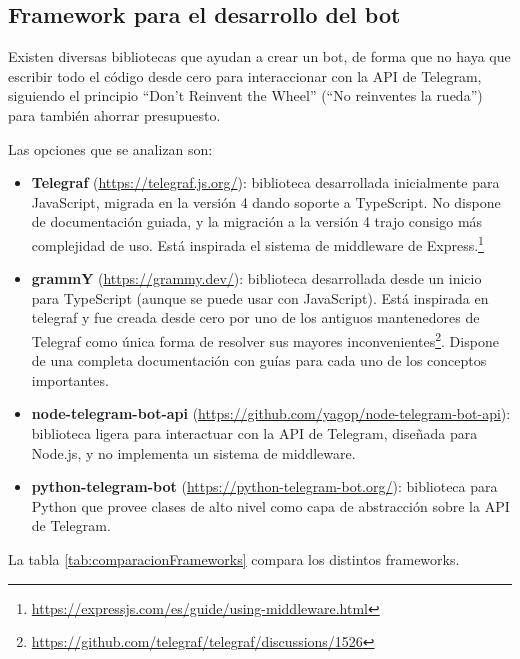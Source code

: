 \subsection{Framework para el desarrollo del bot}\label{subsection:elegirFramework}

Existen diversas bibliotecas que ayudan a crear un bot, de forma que no haya que escribir todo el código desde cero para interaccionar con la API de Telegram, siguiendo el principio ``Don't Reinvent the Wheel'' (``No reinventes la rueda'') para también ahorrar presupuesto.

Las opciones que se analizan son:

\begin{itemize}
    \item \textbf{Telegraf} (\url{https://telegraf.js.org/}): biblioteca desarrollada inicialmente para JavaScript, migrada en la versión 4 dando soporte a TypeScript. No dispone de documentación guiada, y la migración a la versión 4 trajo consigo más complejidad de uso. Está inspirada el sistema de middleware de Express.\footnote{\url{https://expressjs.com/es/guide/using-middleware.html}}
    \item \textbf{grammY} (\url{https://grammy.dev/}): biblioteca desarrollada desde un inicio para TypeScript (aunque se puede usar con JavaScript). Está inspirada en telegraf y fue creada desde cero por uno de los antiguos mantenedores de Telegraf como única forma de resolver sus mayores inconvenientes\footnote{\url{https://github.com/telegraf/telegraf/discussions/1526}}. Dispone de una completa documentación con guías para cada uno de los conceptos importantes.
    \item \textbf{node-telegram-bot-api} (\url{https://github.com/yagop/node-telegram-bot-api}): biblioteca ligera para interactuar con la API de Telegram, diseñada para Node.js, y no implementa un sistema de middleware.
    \item \textbf{python-telegram-bot} (\url{https://python-telegram-bot.org/}): biblioteca para Python que provee clases de alto nivel como capa de abstracción sobre la API de Telegram.
\end{itemize}

La tabla \ref{tab:comparacionFrameworks} compara los distintos frameworks.

